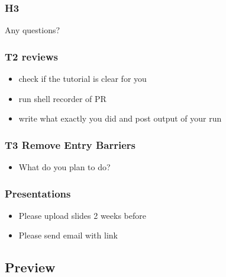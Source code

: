 \begin{assignment}
	\frametitle{H3}

	\begin{task}
	Any questions?
	\end{task}
\end{assignment}

\begin{frame}
	\frametitle{T2 reviews}

	\begin{itemize}
	\item check if the tutorial is clear for you
	\item run shell recorder of PR
	\item write what exactly you did and post output of your run
	\end{itemize}
\end{frame}

\begin{frame}
	\frametitle{T3 Remove Entry Barriers}

	\begin{itemize}
	\item What do you plan to do?
	\end{itemize}
\end{frame}

\begin{frame}
	\frametitle{Presentations}

	\begin{itemize}
	\item Please upload slides 2 weeks before
	\item Please send email with link
	\end{itemize}
\end{frame}

%

\subsection{Preview}

